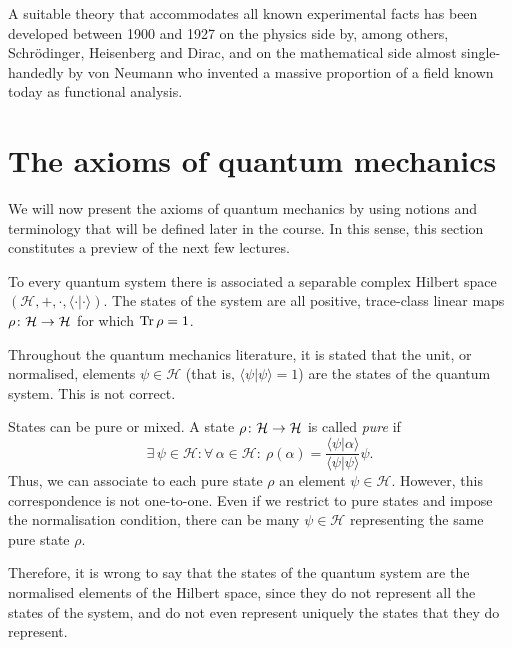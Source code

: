 A suitable theory that accommodates all known experimental facts has been developed between 1900 and 1927 on the physics side by, among others, Schr\"odinger, Heisenberg and Dirac, and on the mathematical side almost single-handedly by von Neumann who invented a massive proportion of a field known today as functional analysis.

\section{The axioms of quantum mechanics}

We will now present the axioms of quantum mechanics by using notions and terminology that will be defined later in the course. In this sense, this section constitutes a preview of the next few lectures. 

\begin{tcolorbox}[colframe=blue!10!black,before skip=10pt,after skip=10pt]
\begin{axiom}
To every quantum system there is associated a separable complex Hilbert space $(\mathcal{H},+,\cdot,\langle \cdot | \cdot \rangle)$. The states of the system are all positive, trace-class linear maps $\rho\colon \mathcal{H}\to \mathcal{H}$ for which $\operatorname{Tr}\rho=1$.
\end{axiom}
\end{tcolorbox}

\begin{remark}
Throughout the quantum mechanics literature, it is stated that the unit, or normalised, elements $\psi\in\mathcal{H}$ (that is, $\langle\psi|\psi\rangle=1$) are the states of the quantum system. This is not correct. 

States can be pure or mixed. A state $\rho\colon \mathcal{H}\to \mathcal{H}$ is called \emph{pure} if
\begin{equation*}
\exists \, \psi\in \mathcal{H} : \forall \, \alpha\in \mathcal{H} : \ \rho(\alpha) = \frac{\langle\psi|\alpha\rangle}{\langle\psi|\psi\rangle}\psi.
\end{equation*}
Thus, we can associate to each pure state $\rho$ an element $\psi\in\mathcal{H}$. However, this correspondence is not one-to-one. Even if we restrict to pure states and impose the normalisation condition, there can be many $\psi\in\mathcal{H}$ representing the same pure state $\rho$. 

Therefore, it is wrong to say that the states of the quantum system are the normalised elements of the Hilbert space, since they do not represent all the states of the system, and do not even represent uniquely the states that they do represent.
\end{remark}

